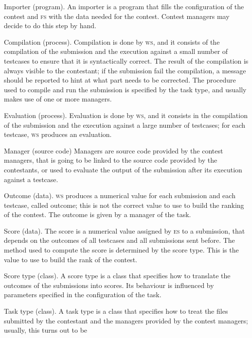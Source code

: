 \documentclass[a4paper,8pt]{amsart}
\newcommand{\FS}{\textsc{fs}}
\newcommand{\ES}{\textsc{es}}
\newcommand{\WS}{\textsc{ws}}
\newenvironment{squishlist}{%
  \begin{list}{\textbullet}%
    { \setlength{\itemsep}{0pt}%
      \setlength{\parsep}{3pt}%
      \setlength{\topsep}{3pt}%
      \setlength{\partopsep}{0pt}%
      \setlength{\leftmargin}{1.5em}%
      \setlength{\labelwidth}{1em}%
      \setlength{\labelsep}{0.5em} }%
}{\end{list}}
\begin{document}
\begin{multicols}{2}
  \begin{squishlist}
  \item[Importer (program).] An importer is a program that fills the
    configuration of the contest and \FS{} with the data needed for
    the contest. Contest managers may decide to do this step by hand.
  \item[Compilation (process).] Compilation is done by \WS{}, and it
    consists of the compilation of the submission and the execution
    against a small number of testcases to ensure that it is
    syntactically correct. The result of the compilation is always
    visible to the contestant; if the submission fail the compilation,
    a message should be reported to hint at what part needs to be
    corrected. The procedure used to compile and run the submission is
    specified by the task type, and usually makes use of one or more
    managers.
  \item[Evaluation (process).] Evaluation is done by \WS{}, and it
    consists in the compilation of the submission and the execution
    against a large number of testcases; for each testcase, \WS{}
    produces an evaluation.
  \item[Manager (source code)] Managers are source code provided by
    the contest managers, that is going to be linked to the source
    code provided by the contestants, or used to evaluate the output
    of the submission after its execution against a testcase.
  \item[Outcome (data).] \WS{} produces a numerical value for each
    submission and each testcase, called outcome; this is not the
    correct value to use to build the ranking of the contest. The
    outcome is given by a manager of the task.
  \item[Score (data).] The score is a numerical value assigned by
    \ES{} to a submission, that depends on the outcomes of all
    testcases and all submissions sent before. The method used to
    compute the score is determined by the score type. This is the
    value to use to build the rank of the contest.
  \item[Score type (class).] A score type is a class that specifies
    how to translate the outcomes of the submissions into scores. Its
    behaviour is influenced by parameters specified in the
    configuration of the task.
  \item[Task type (class).] A task type is a class that specifies how
    to treat the files submitted by the contestant and the managers
    provided by the contest managers; usually, this turns out to be

\end{squishlist}
\end{multicols}
\end{document}

